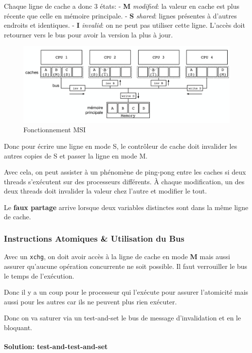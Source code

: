 Chaque ligne de cache a donc 3 états: - \textbf{M} \emph{modified}: la
valeur en cache est plus récente que celle en mémoire principale. -
\textbf{S} \emph{shared}: lignes présentes à d'autres endroits et
identiques. - \textbf{I} \emph{invalid}: on ne peut pas utiliser cette
ligne. L'accès doit retourner vers le bus pour avoir la version la plus
à jour.

\begin{figure}
\centering
\includegraphics{image-29-1.png}
\caption{Fonctionnement MSI}
\end{figure}

Donc pour écrire une ligne en mode S, le contrôleur de cache doit
invalider les autres copies de S et passer la ligne en mode M.

Avec cela, on peut assister à un phénomène de ping-pong entre les caches
si deux threads s'exécutent sur des processeurs différents. À chaque
modification, un des deux threads doit invalider la valeur chez l'autre
et modifier le tout.

Le \textbf{faux partage} arrive lorsque deux variables distinctes sont
dans la même ligne de cache.

\subsubsection{Instructions Atomiques \& Utilisation du
Bus}\label{instructions-atomiques-utilisation-du-bus}

Avec un \texttt{xchg}, on doit avoir accès à la ligne de cache en mode
\textbf{M} mais aussi assurer qu'aucune opération concurrente ne soit
possible. Il faut verrouiller le bus le temps de l'exécution.

Donc il y a un coup pour le processeur qui l'exécute pour assurer
l'atomicité mais aussi pour les autres car ils ne peuvent plus rien
exécuter.

Donc on va saturer via un test-and-set le bus de message d'invalidation
et en le bloquant.

\paragraph{Solution:
test-and-test-and-set}\label{solution-test-and-test-and-set}

